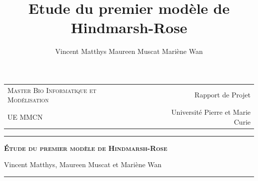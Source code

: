 \documentclass[12pt,a4paper,onecolumn]{article}
\title{Etude du premier modèle de Hindmarsh-Rose}
\author{Vincent Matthys Maureen Muscat Mariène Wan}
\begin{document}
\begin{tabularx}{\textwidth}{@{} l X r @{} }
{\textsc{Master Bio Informatique et Modélisation}} & & Rapport de Projet \\
UE MMCN & &{Université Pierre et Marie Curie}\\
\end{tabularx}
\vspace{1.5cm}
\begin{center}

\rule[11pt]{5cm}{0.5pt}

\textbf{\LARGE \textsc{Étude du premier modèle de Hindmarsh-Rose}}
\vspace{0.5cm}

Vincent Matthys, Maureen Muscat et Mariène Wan


\rule{5cm}{0.5pt}

\vspace{1.5cm}



\end{center}
\end{document}
